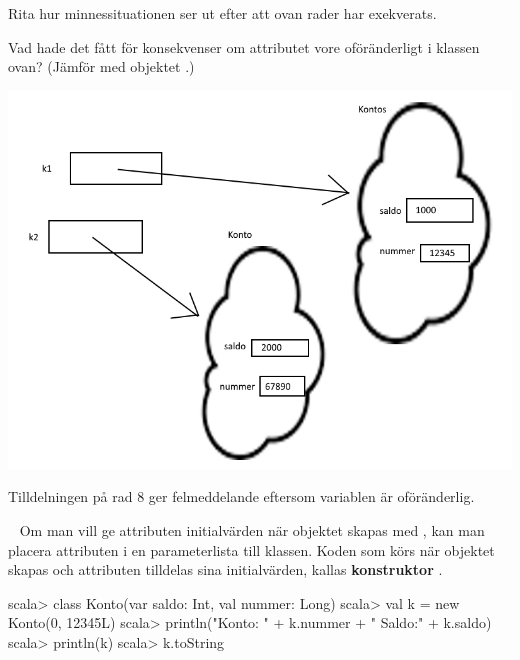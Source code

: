 \Subtask\Pen Rita hur minnessituationen ser ut efter att ovan rader har exekverats.

\Subtask\Pen Vad hade det fått för konsekvenser om attributet  vore oföränderligt i klassen ovan? (Jämför med objektet .)


\SOLUTION


\TaskSolved \what


\SubtaskSolved   \includegraphics[scale=0.5]{../img/w04-solutions/uppgift-3a}

\SubtaskSolved
Tilldelningen på rad 8  ger felmeddelande eftersom variablen är oföränderlig.


\QUESTEND









\QUESTBEGIN

\Task  \what~  Om man vill ge attributen initialvärden när objektet skapas med , kan man placera attributen i en parameterlista till klassen. Koden som körs när objektet skapas och attributen tilldelas sina initialvärden, kallas \textbf{konstruktor} .

\begin{REPL}
scala> class Konto(var saldo: Int, val nummer: Long)
scala> val k = new Konto(0, 12345L)
scala> println("Konto: " + k.nummer + " Saldo:" + k.saldo)
scala> println(k)
scala> k.toString
\end{REPL}

